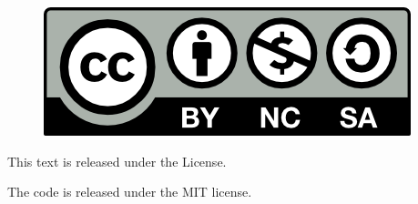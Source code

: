 \begin{figure}
    \centering
    \includegraphics[width = .3\textwidth]{Images/by-nc-sa.png}
\end{figure}

\noindent This text is released under the  License.

\smallskip
\noindent The code is released under the MIT license. 